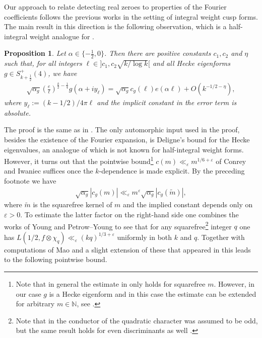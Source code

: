 \documentclass[a4paper,10pt,twoside]{amsart}
\newtheorem{prop}[theorem]{Proposition}
\theoremstyle{definition}
\numberwithin{equation}{section}
\newcommand\eps{\varepsilon}
\renewcommand\:{\colon}
\begin{document}
\noindent Our approach to relate detecting real zeroes to properties of the Fourier coefficients follows the previous works \cite{Ghosh-Sarnak2012, Matomaki2016, Lester-Matomaki-Radziwill2018} in the setting of integral weight cusp forms. The main result in this direction is the following observation, which is a half-integral weight analogue for \cite[Theorem 3.1.]{Ghosh-Sarnak2012}.

\begin{prop}\label{Fourier-coeff}
Let $\alpha\in\{-\frac12,0\}$. Then there are positive constants $c_1,c_2$ and $\eta$ such that, for all integers $\ell\in]c_1,c_2\sqrt{k/\log k}[$ and all Hecke eigenforms $g\in S^+_{k+\frac12}(4)$, we have
\begin{align*}
\sqrt{\alpha_g}\left(\frac e{\ell}\right)^{\frac{k}2-\frac14}g(\alpha+iy_\ell)=\sqrt{\alpha_g}c_g(\ell)e(\alpha\ell)+O(k^{-1/2-\eta}),
\end{align*}
where $y_\ell:=(k-1/2)/4\pi\ell$ and the implicit constant in the error term is absolute. 
\end{prop}
\noindent The proof is the same as in \cite{Ghosh-Sarnak2012}. The only automorphic input used in the proof, besides the existence of the Fourier expansion, is Deligne's bound for the Hecke eigenvalues, an analogue of which is not known for half-integral weight forms. However, it turns out that the pointwise bound\footnote{Note that in general the estimate in \cite{Conrey-Iwaniec2000} only holds for squarefree $m$. However, in our case $g$ is a Hecke eigenform and in this case the estimate can be extended for arbitrary $m\in\mathbb N$, see \cite[Lemma 3.3.]{JLLRW2019}.} $c(m)\ll_\varepsilon m^{1/6+\varepsilon}$ of Conrey and Iwaniec \cite[Corollary 3]{Conrey-Iwaniec2000} suffices once the $k$-dependence is made explicit. By the preceding footnote we have 
\begin{align}\label{square-free-upper-bound}
\sqrt{\alpha_g}|c_g(m)|\ll_\eps m^\eps\sqrt{\alpha_g}|c_g(\tilde m)|,
\end{align}
where $\tilde m$ is the squarefree kernel of $m$ and the implied constant depends only on $\eps>0$. To estimate the latter factor on the right-hand side one combines the works of Young \cite{Young2017} and Petrow--Young \cite{Petrow-Young2019} to see that for any squarefree\footnote{Note that in \cite{Young2017} the conductor of the quadratic character was assumed to be odd, but the same result holds for even discriminants as well \cite[Appendix A]{Andersen-Duke2020}.} integer $q$ one has $L(1/2,f\otimes\chi_q)\ll_\eps (kq)^{1/3+\eps}$ uniformly in both $k$ and $q$. Together with computations of Mao \cite[Appendix 2]{Mao2007} and a slight extension of these that appeared in \cite[Section 9]{Blomer-Harcos2008} this leads to the following pointwise bound. 
\end{document}

